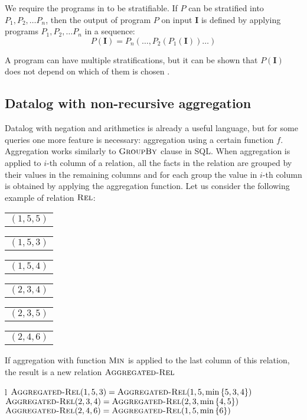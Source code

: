 We require the programs in \datalogneg to be stratifiable. If $P$ can be stratified into $P_1, P_2, \dots P_n$, then the output of program $P$ on input $\textbf{I}$ is defined by applying programs $P_1, P_2, \dots P_n$ in a sequence:
$$P(\textbf{I}) = P_n(\dots, P_2(P_1(\textbf{I}))\dots)$$

A program can have multiple stratifications, but it can be shown that $P(\textbf{I})$ does not depend on which of them is chosen \cite{fod}.


\subsection{Datalog with non-recursive aggregation}\label{ss:datalognra}

Datalog with negation and arithmetics is already a useful language, but for some queries one more feature is necessary: aggregation using a certain function $f$. Aggregation works similarly to $\textsc{GroupBy}$ clause in SQL. When aggregation is applied to $i$-th column of a relation, all the facts in the relation are grouped by their values in the remaining columns and for each group the value in $i$-th column is obtained by applying the aggregation function.
Let us consider the following example of relation $\textsc{Rel}$:

\begin{center}
\begin{tabular}{l}
  $(1, 5, 5)$
\end{tabular}
\quad
\begin{tabular}{l}
  $(1, 5, 3)$
\end{tabular}
\quad
\begin{tabular}{l}
  $(1, 5, 4)$
\end{tabular}
\quad
\begin{tabular}{l}
  $(2, 3, 4)$
\end{tabular}
\quad
\begin{tabular}{l}
  $(2, 3, 5)$
\end{tabular}
\quad
\begin{tabular}{l}
  $(2, 4, 6)$
\end{tabular}
\end{center}


If aggregation with function $\textsc{Min}$ is applied to the last column of this relation, the result is a new relation $\textsc{Aggregated-Rel}$

\begin{centab}{ l }
  $\textsc{Aggregated-Rel}(1, 5, 3) = \textsc{Aggregated-Rel}(1, 5, \min{\{5, 3, 4\}})$ \\
  $\textsc{Aggregated-Rel}(2, 3, 4) = \textsc{Aggregated-Rel}(2, 3, \min{\{4, 5\}})$ \\
  $\textsc{Aggregated-Rel}(2, 4, 6) = \textsc{Aggregated-Rel}(1, 5, \min{\{6\}})$ \\
\end{centab}

